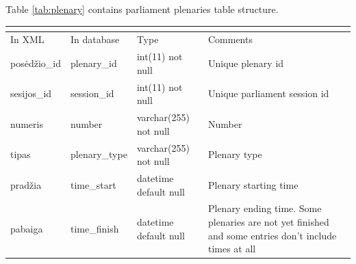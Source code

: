 \documentclass[a4paper,12pt]{article}
\begin{document}
	\noindent
	Table \ref{tab:plenary} contains parliament plenaries table structure.
	\begin{center}
		\begin{tabular}{L{3cm} L{3cm} L{2.2cm} L{3.8cm}}
			\\ 
			\hline
			In XML & In database & Type & Comments\\
			\hline
			posėdžio\_id & plenary\_id & int(11) not null & Unique plenary id \\
			sesijos\_id & session\_id & int(11) not null & Unique parliament session id \\
			numeris & number & varchar(255) not null & Number \\ 
			tipas & plenary\_type & varchar(255) not null & Plenary type \\ 
			pradžia & time\_start & datetime default null & Plenary starting time \\
			pabaiga & time\_finish & datetime default null & Plenary ending time. Some plenaries are not yet finished and some entries don't include times at all \\
			\hline
		\end{tabular}
		 \label{tab:plenary}
	\end{center}
	
	\hfill
	
\end{document}
